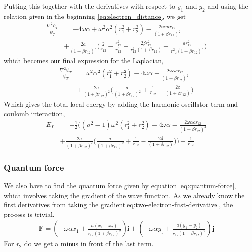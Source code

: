 \documentclass[11pt]{article}
\begin{document}
Putting this together with the derivatives with respect to $y_1$ and $y_2$ and using the relation given in the beginning \eqref{eq:electron_distance}, we get
\begin{align*}
	\frac{\nabla^2 \psi_T}{\psi_T} &= - 4\omega \alpha + \omega^2 \alpha ^2(r_1^2 + r_2^2) - \frac{2\omega\alpha a r_{12}}{(1+\beta r_{12})^2} \\
	&+ \frac{2a}{(1+\beta r_{12})^2}\bigg( \frac{2}{r_{12}} - \frac{r_{12}^2}{r_{12}^3} - \frac{2\beta r_{12}^2}{r_{12}^2(1+ \beta r_{12})} + \frac{a r_{12}^2}{r_{12}^2(1+\beta r_{12})^2}\bigg)
\end{align*}
which becomes our final expression for the Laplacian,
\begin{align}
	\frac{\nabla^2 \psi_T}{\psi_T} &= \omega^2 \alpha ^2(r_1^2 + r_2^2) - 4\omega \alpha - \frac{2\omega\alpha a r_{12}}{(1+\beta r_{12})^2} \\
	&+ \frac{2a}{(1+\beta r_{12})^2}\bigg(\frac{a }{(1+\beta r_{12})^2} + \frac{1}{r_{12}} - \frac{2\beta}{(1+ \beta r_{12})} \bigg)
	\label{eq:two-electron-laplacian}
\end{align}
Which gives the total local energy by adding the harmonic oscillator term and coulomb interaction,
\begin{align}
	E_L &= -\frac{1}{2}\bigg((\alpha ^2-1)\omega^2(r_1^2 + r_2^2) - 4\omega \alpha - \frac{2\omega\alpha a r_{12}}{(1+\beta r_{12})^2} \\
	&+ \frac{2a}{(1+\beta r_{12})^2}\bigg(\frac{a }{(1+\beta r_{12})^2} + \frac{1}{r_{12}} - \frac{2\beta}{(1+ \beta r_{12})} \bigg)\bigg) + \frac{1}{r_{12}}
	\label{eq:two-electron-local-energy}
\end{align}

\subsubsection{Quantum force}
We also have to find the quantum force given by equation \eqref{eq:quantum-force}, which involves taking the gradient of the wave function. As we already know the first derivatives from taking the gradient\eqref{eq:two-electron-first-derivative}, the process is trivial.
\begin{align}
	\mathbf{F} = \left(-\omega\alpha x_1 + \frac{a(x_1-x_2)}{r_{12}(1+\beta r_{12})^2} \right)\mathbf{i} + \left(-\omega\alpha y_1 + \frac{a(y_1-y_2)}{r_{12}(1+\beta r_{12})^2} \right)\mathbf{j}
	\label{eq:two-electron-quantum-force}
\end{align}
For $r_2$ do we get a minus in front of the last term.
\end{document}
